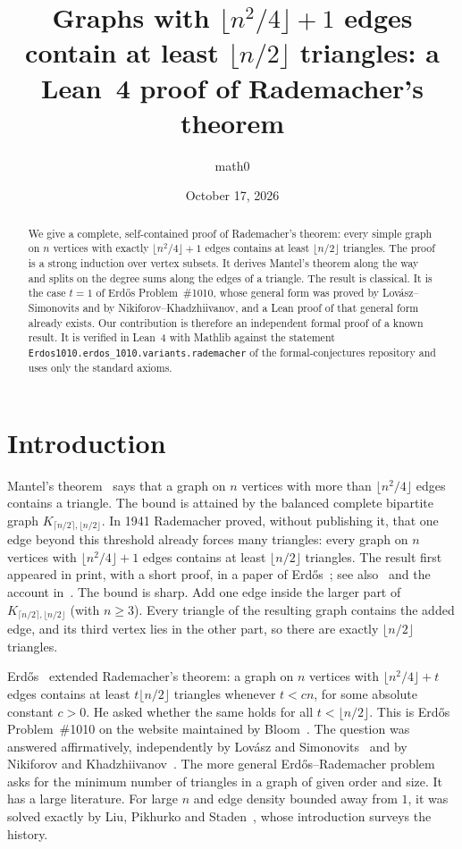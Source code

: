 \documentclass[11pt]{amsart}
\title[Rademacher's theorem in Lean 4]{Graphs with $\lfloor n^2/4\rfloor+1$ edges contain at least $\lfloor n/2\rfloor$ triangles: a Lean~4 proof of Rademacher's theorem}
\author{math0}
\date{October 17, 2026}
\theoremstyle{plain}
\theoremstyle{definition}
\begin{document}
\begin{abstract}
We give a complete, self-contained proof of Rademacher's theorem: every simple graph on $n$
vertices with exactly $\lfloor n^2/4\rfloor+1$ edges contains at least $\lfloor n/2\rfloor$
triangles. The proof is a strong induction over vertex subsets. It derives Mantel's theorem
along the way and splits on the degree sums along the edges of a triangle. The result is
classical. It is the case $t=1$ of Erdős Problem~\#1010, whose general form was proved by
Lovász--Simonovits and by Nikiforov--Khadzhiivanov, and a Lean proof of that general form
already exists. Our contribution is therefore an independent formal proof of a known result. It
is verified in Lean~4 with Mathlib against the statement
\texttt{Erdos1010.erdos\_1010.variants.rademacher} of the formal-conjectures repository and uses
only the standard axioms.
\end{abstract}
\maketitle

\section{Introduction}

Mantel's theorem~\cite{Mantel} says that a graph on $n$ vertices with more than
$\lfloor n^2/4\rfloor$ edges contains a triangle. The bound is attained by the balanced complete
bipartite graph $K_{\lceil n/2\rceil,\lfloor n/2\rfloor}$. In 1941 Rademacher proved, without
publishing it, that one edge beyond this threshold already forces many triangles: every graph on
$n$ vertices with $\lfloor n^2/4\rfloor+1$ edges contains at least $\lfloor n/2\rfloor$ triangles.
The result first appeared in print, with a short proof, in a paper of Erdős~\cite{Erdos55}; see also~\cite{Erdos62} and the account
in~\cite{LiuPikhurko}. The bound is sharp. Add one edge inside the larger part of
$K_{\lceil n/2\rceil,\lfloor n/2\rfloor}$ (with $n\ge 3$). Every triangle of the resulting graph
contains the added edge, and its third vertex lies in the other part, so there are exactly
$\lfloor n/2\rfloor$ triangles.

Erdős~\cite{Erdos62} extended Rademacher's theorem: a graph on $n$ vertices with
$\lfloor n^2/4\rfloor+t$ edges contains at least $t\lfloor n/2\rfloor$ triangles whenever $t<cn$,
for some absolute constant $c>0$. He asked whether the same holds for all
$t<\lfloor n/2\rfloor$. This is Erdős Problem~\#1010 on the website maintained by
Bloom~\cite{EP1010}. The question was answered affirmatively, independently by Lovász and
Simonovits~\cite{LovaszSimonovits} and by Nikiforov and Khadzhiivanov~\cite{NikiforovKh}.
The more general Erdős--Rademacher problem asks for the minimum number of triangles in a graph of
given order and size. It has a large literature. For large $n$ and edge density bounded away
from $1$, it was solved exactly by Liu, Pikhurko and Staden~\cite{LPS}, whose introduction surveys
the history.
\end{document}
